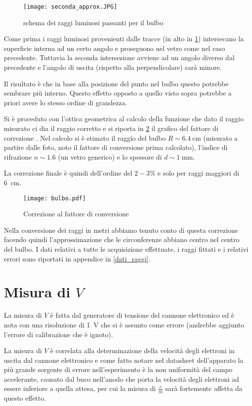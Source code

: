 \begin{figure}[H]
	\centering
	\texttt{[image: seconda\_approx.JPG]}
	\caption{schema dei raggi luminosi passanti per il bulbo}
	\label{ottica2}
\end{figure}

Come prima i raggi luminosi provenienti dalle tracce (in alto in \figurename{ \ref{ottica2}}) intersecano la superficie interna ad un certo angolo e proseguono nel vetro come nel caso precedente. Tuttavia la seconda intersezione avviene ad un angolo diverso dal precedente e l'angolo di uscita (rispetto alla perpendicolare) sarà minore.

Il risultato è che in base alla posizione del punto nel bulbo questo potrebbe sembrare più interno. Questo effetto opposto a quello visto sopra potrebbe a priori avere lo stesso ordine di grandezza.

Si è proceduto con l'ottica geometrica al calcolo della funzione che dato il raggio misurato ci dia il raggio corretto e si riporta in \figurename{ \ref{bulbo}} il grafico del fattore di correzione . Nel calcolo si è stimato il raggio del bulbo $R \sim \SI{6.4}{\cm}$ (misurato a partire dalle foto, noto il fattore di conversione prima calcolato), l'indice di rifrazione $n \sim 1.6$ (un vetro generico) e lo spessore di $d \sim \SI{1}{\mm}$.

La correzione finale è quindi dell'ordine del $2-3\%$ e solo per raggi maggiori di \SI{6}{\cm}.

\begin{figure}[H]
	\centering
	\texttt{[image: bulbo.pdf]}
	\caption{Correzione al fattore di conversione}
	\label{bulbo}
\end{figure}

Nella conversione dei raggi in metri abbiamo tenuto conto di questa correzione facendo quindi l'approssimazione che le circonferenze abbiano centro nel centro del bulbo.
I dati relativi a tutte le acquisizione effettuate, i raggi fittati e i relativi errori sono riportati in appendice in \tablename{ \ref{dati_raggi}}.

\section{Misura di $V$}
La misura di $V$ è fatta dal generatore di tensione del cannone elettronico ed è nota con una risoluzione di \SI{1}{\volt} che si è assunto come errore (andrebbe aggiunto l'errore di calibrazione che è ignoto).

La misura di $V$ è correlata alla determinazione della velocità degli elettroni in uscita dal cannone elettronico e come fatto notare nel datasheet dell'apparato la più grande sorgente di errore nell'esperimento è la non uniformità del campo accelerante, causato dal buco nell'anodo che porta la velocità degli elettroni ad essere inferiore a quella attesa, per cui la misura di $\tfrac{e}{m}$ sarà fortemente affetta da questo effetto.

